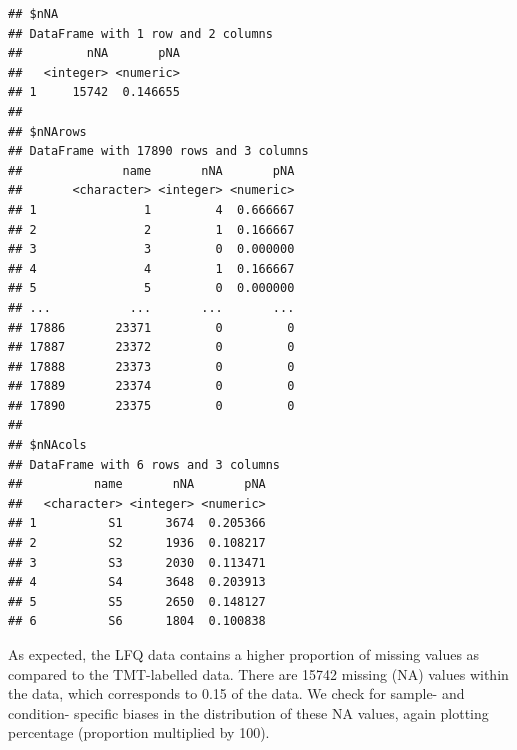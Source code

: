 \documentclass[9pt,a4paper,]{extarticle}
\newenvironment{Shaded}{\begin{snugshade}}{\end{snugshade}}
\newcommand{\AttributeTok}[1]{\textcolor[rgb]{0.13,0.29,0.53}{#1}}
\newcommand{\DecValTok}[1]{\textcolor[rgb]{0.00,0.00,0.81}{#1}}
\newcommand{\DocumentationTok}[1]{\textcolor[rgb]{0.56,0.35,0.01}{\textbf{\textit{#1}}}}
\newcommand{\FunctionTok}[1]{\textcolor[rgb]{0.13,0.29,0.53}{\textbf{#1}}}
\newcommand{\NormalTok}[1]{#1}
\newcommand{\SpecialCharTok}[1]{\textcolor[rgb]{0.81,0.36,0.00}{\textbf{#1}}}
\newcommand{\StringTok}[1]{\textcolor[rgb]{0.31,0.60,0.02}{#1}}
\begin{document}
\begin{verbatim}
## $nNA
## DataFrame with 1 row and 2 columns
##         nNA       pNA
##   <integer> <numeric>
## 1     15742  0.146655
## 
## $nNArows
## DataFrame with 17890 rows and 3 columns
##              name       nNA       pNA
##       <character> <integer> <numeric>
## 1               1         4  0.666667
## 2               2         1  0.166667
## 3               3         0  0.000000
## 4               4         1  0.166667
## 5               5         0  0.000000
## ...           ...       ...       ...
## 17886       23371         0         0
## 17887       23372         0         0
## 17888       23373         0         0
## 17889       23374         0         0
## 17890       23375         0         0
## 
## $nNAcols
## DataFrame with 6 rows and 3 columns
##          name       nNA       pNA
##   <character> <integer> <numeric>
## 1          S1      3674  0.205366
## 2          S2      1936  0.108217
## 3          S3      2030  0.113471
## 4          S4      3648  0.203913
## 5          S5      2650  0.148127
## 6          S6      1804  0.100838
\end{verbatim}

As expected, the LFQ data contains a higher proportion of missing values as
compared to the TMT-labelled data. There are 15742
missing (NA) values within the data, which corresponds to
0.15 of the data.
We check for sample- and condition- specific biases in the distribution of these
NA values, again plotting percentage (proportion multiplied by 100).

\begin{Shaded}
\end{Shaded}
\end{document}
